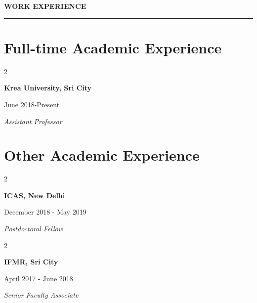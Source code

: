 \documentclass[10pt]{article}
\begin{document}
\vspace{3pt}

\vspace{0.4cm}

\begin{large}{\bf WORK EXPERIENCE}\end{large}
  \vspace{3pt}
  \hrule

\section*{ Full-time Academic Experience}
   \begin{multicols}{2}
    \begin{flushleft}{\bf Krea University, Sri City}\end{flushleft}
    \begin{flushright}June 2018-Present\end{flushright}
  \end{multicols}
  \vspace{-.3cm}

\textit{Assistant Professor}

\section*{Other Academic Experience}

\begin{multicols}{2}
    \begin{flushleft}{\bf ICAS, New Delhi}\end{flushleft}
    \begin{flushright}December 2018 - May 2019\end{flushright}
  \end{multicols}
  \vspace{-0.3cm}

\textit{Postdoctoral Fellow}

\vspace{0.3cm}

\begin{multicols}{2}
    \begin{flushleft}{\bf IFMR, Sri City}\end{flushleft}
    \begin{flushright}April 2017 - June 2018\end{flushright}
  \end{multicols}
  \vspace{-.3cm}

\textit{Senior Faculty Associate}
\end{document}
